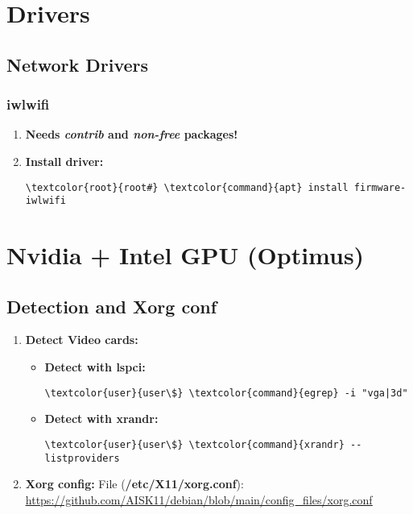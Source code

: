 \documentclass[10pt, a4paper, onecolumn, openany]{book} %
\begin{document}
\chapter{Drivers}
\section{Network Drivers}
\subsection{iwlwifi}
\begin{enumerate} 
    \item \textbf{Needs \textit{contrib} and \textit{non-free} packages!}
    \item \textbf{Install driver:}
\begin{Verbatim}[commandchars=\\\{\}]
\textcolor{root}{root#} \textcolor{command}{apt} install firmware-iwlwifi
\end{Verbatim}
\end{enumerate}
\chapter{Nvidia + Intel GPU (Optimus)}
\section{Detection and Xorg conf}
\begin{enumerate}
    \item \textbf{Detect Video cards:}
\begin{itemize}
    \item \textbf{Detect with lspci:}
\begin{Verbatim}[commandchars=\\\{\}]
\textcolor{user}{user\$} \textcolor{command}{egrep} -i "vga|3d"
\end{Verbatim}
    \item \textbf{Detect with xrandr:}
\begin{Verbatim}[commandchars=\\\{\}]
\textcolor{user}{user\$} \textcolor{command}{xrandr} --listproviders
\end{Verbatim}
\end{itemize}
    \item \textbf{Xorg config:}
\newline File (\textbf{\textcolor{file}{/etc/X11/xorg.conf}}):
\newline \underline{\url{https://github.com/AISK11/debian/blob/main/config_files/xorg.conf}}
\end{enumerate}
\end{document}
